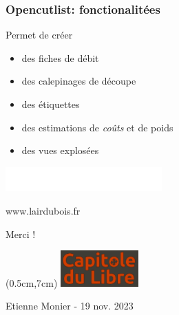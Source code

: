 \begin{frame}
  \frametitle{Opencutlist: fonctionalitées}

  Permet de créer
  \begin{itemize}
    \item des fiches de débit
    \item des calepinages de découpe
    \item des étiquettes
    \item des estimations de \emph{coûts} et de poids
    \item des vues explosées
  \end{itemize}

\end{frame}

\begin{frame}
  \begin{center}
  \end{center}
\end{frame}


\begin{frame}
  \begin{center}
    \includegraphics[width=6cm]{img/logo.png}

    www.lairdubois.fr

    \vspace{1cm}
    {\Large Merci !}
  \end{center}

  \begin{textblock*}{10cm}(0.5cm,7cm)
    \includegraphics[width=3cm]{img/capitole_du_libre_logo.png}

    {\small Etienne Monier - 19 nov. 2023}
    \end{textblock*}

\end{frame}

